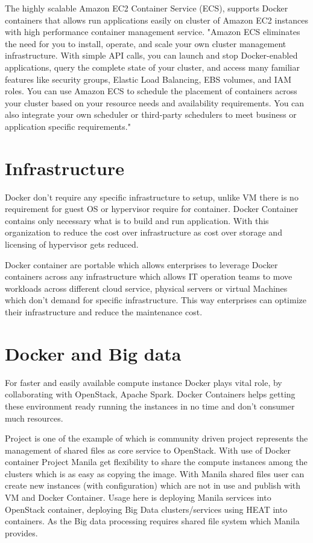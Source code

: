 \documentclass[9pt,twocolumn,twoside]{../../styles/osajnl}
\begin{document}
The highly scalable Amazon EC2 Container Service (ECS), supports Docker containers that allows run applications easily on cluster of Amazon EC2 instances with high performance container management service. "Amazon ECS eliminates the need for you to install, operate, and scale your own cluster management infrastructure. With simple API calls, you can launch and stop Docker-enabled applications, query the complete state of your cluster, and access many familiar features like security groups, Elastic Load Balancing, EBS volumes, and IAM roles. You can use Amazon ECS to schedule the placement of containers across your cluster based on your resource needs and availability requirements. You can also integrate your own scheduler or third-party schedulers to meet business or application specific requirements."\cite{ECS} 

\section{Infrastructure}
Docker don't require any specific infrastructure to setup, unlike VM there is no requirement for guest OS or hypervisor require for container. Docker Container contains only necessary what is to build and run application. With this organization to reduce the cost over infrastructure as cost over storage and licensing of hypervisor gets reduced.

Docker container are portable which allows enterprises to leverage Docker containers across any infrastructure which allows IT operation teams to move workloads across different cloud service, physical servers or virtual Machines which don't demand for specific infrastructure. This way enterprises can optimize their infrastructure and reduce the maintenance cost.

\section{Docker and Big data}
For faster and easily available compute instance Docker plays vital role, by collaborating with OpenStack, Apache Spark. Docker Containers helps getting these environment ready running the instances in no time and don't consumer much resources.

Project is one of the example of which is community driven project represents the management of shared files as core service to OpenStack. With use of Docker container Project Manila get flexibility to share the compute instances among the clusters which is as easy as copying the image. With Manila shared files user can create new instances (with configuration) which are not in use and publish with VM and Docker Container. Usage here is deploying Manila services into OpenStack container, deploying Big Data clusters/services using HEAT into containers. As the Big data processing requires shared file system which Manila provides.\cite{Manila}
\end{document}
